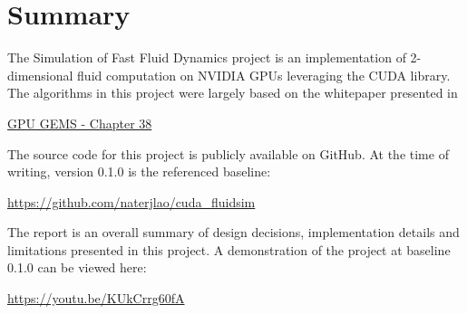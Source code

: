 \documentclass[
10pt, %
letterpaper, %
oneside, %
headinclude,footinclude, %
BCOR5mm, %
]{scrartcl}
\title{\normalfont{Fluid Simulation on CUDA GPUs}}
\subtitle{Johns Hopkins University: EN.605.617.81.SP23 Introduction to GPU Programming }
\author{\spacedlowsmallcaps{Nate Lao (nlao1@jh.edu)}}
\date{May 7th 2023}
\begin{document}
\maketitle

\section{Summary} %
The Simulation of Fast Fluid Dynamics project is an implementation of 2-dimensional fluid computation on NVIDIA GPUs leveraging the CUDA library.
The algorithms in this project were largely based on the whitepaper presented in

\begin{center}
    \href{https://developer.nvidia.com/gpugems/gpugems/part-vi-beyond-triangles/chapter-38-fast-fluid-dynamics-simulation-gpu}{GPU GEMS - Chapter 38}
\end{center}

The source code for this project is publicly available on GitHub. At the time of writing, version 0.1.0 is the referenced baseline:

\begin{center}
    \url{https://github.com/naterjlao/cuda_fluidsim}
\end{center}

The report is an overall summary of design decisions, implementation details and limitations presented in this project. A demonstration of the project
at baseline 0.1.0 can be viewed here:

\begin{center}
    \url{https://youtu.be/KUkCrrg60fA}
\end{center}
\end{document}

